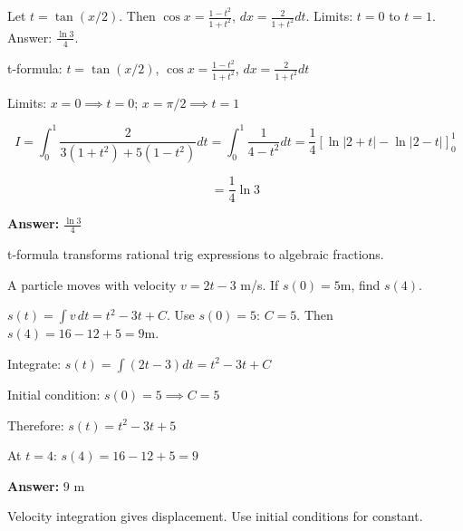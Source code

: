 \begin{hint}
Let $t = \tan(x/2)$. Then $\cos x = \frac{1-t^2}{1+t^2}$, $dx = \frac{2}{1+t^2}dt$. Limits: $t=0$ to $t=1$. Answer: $\frac{\ln 3}{4}$.
\end{hint}

\begin{solution}
t-formula: $t=\tan(x/2)$, $\cos x = \frac{1-t^2}{1+t^2}$, $dx=\frac{2}{1+t^2}dt$

Limits: $x=0 \implies t=0$; $x=\pi/2 \implies t=1$

\[
I = \int_0^1 \frac{2}{3(1+t^2)+5(1-t^2)}dt = \int_0^1 \frac{1}{4-t^2}dt = \frac{1}{4}[\ln|2+t|-\ln|2-t|]_0^1
\]

\[
= \frac{1}{4}\ln 3
\]

\textbf{Answer:} $\boxed{\frac{\ln 3}{4}}$
\end{solution}

\begin{takeaways}
t-formula transforms rational trig expressions to algebraic fractions.
\end{takeaways}

\vspace{1cm}

\begin{problem}
A particle moves with velocity $v = 2t - 3$ m/s. If $s(0) = 5$m, find $s(4)$.
\end{problem}

\begin{hint}
$s(t) = \int v \, dt = t^2 - 3t + C$. Use $s(0)=5$: $C=5$. Then $s(4) = 16 - 12 + 5 = 9$m.
\end{hint}

\begin{solution}
Integrate: $s(t) = \int(2t-3)dt = t^2 - 3t + C$

Initial condition: $s(0) = 5 \implies C = 5$

Therefore: $s(t) = t^2 - 3t + 5$

At $t=4$: $s(4) = 16 - 12 + 5 = 9$

\textbf{Answer:} $\boxed{9 \text{ m}}$
\end{solution}

\begin{takeaways}
Velocity integration gives displacement. Use initial conditions for constant.
\end{takeaways}

